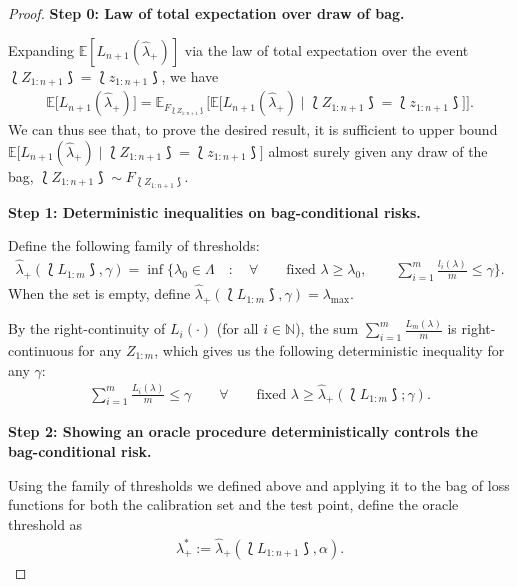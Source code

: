 \begin{proof} \qquad

\textbf{Step 0: Law of total expectation over draw of bag.}

Expanding $\mathbb{E}[L_{n+1}(\hat{\lambda}_{+})]$ via the law of total expectation over the event $\lbag Z_{1:n+1} \rbag = \lbag z_{1:n+1} \rbag$, we have
\begin{align}\label{eq:gcrc_exchangeable_step_0}
    \mathbb{E}\big[L_{n+1}(\hat{\lambda}_{+})\big] = \mathbb{E}_{F_{\lbag Z_{1:n+1}\rbag}}\Big[\mathbb{E}\Big[L_{n+1}(\hat{\lambda}_{+}) \mid \lbag Z_{1:n+1} \rbag = \lbag z_{1:n+1} \rbag\Big]\Big].
\end{align}
We can thus see that, to prove the desired result, it is sufficient to upper bound $\mathbb{E}\big[L_{n+1}(\hat{\lambda}_{+}) \mid \lbag Z_{1:n+1} \rbag = \lbag z_{1:n+1} \rbag\big]$ almost surely given any draw of the bag, $\lbag Z_{1:n+1}\rbag\sim F_{\lbag Z_{1:n+1}\rbag}$. 

\vspace{1cm}

\textbf{Step 1: Deterministic inequalities on bag-conditional risks.} 


Define the following family of thresholds:
\begin{align*}
    \hat{\lambda}_+(\lbag L_{1:m} \rbag, \gamma) = \inf \Big\{\lambda_0 \in \Lambda \quad : \quad \forall \qquad \text{fixed } \lambda \geq \lambda_0, \qquad \sum_{i=1}^{m}\frac{l_{i}(\lambda)}{m} \leq \gamma \Big\}.
\end{align*}
When the set is empty, define $\hat{\lambda}_+(\lbag L_{1:m} \rbag, \gamma)=\lambda_{\max}$.

By the right-continuity of $L_i(\cdot)$ (for all $i\in \mathbb{N}$), the sum $\sum_{i=1}^m\frac{L_m(\lambda)}{m}$ is right-continuous for any $Z_{1:m}$, which gives us the following deterministic inequality for any $\gamma$:
\begin{align}
    \label{eq:gcrc_exchangeable_step_1}
    \sum_{i=1}^m\frac{L_i(\lambda)}{m} \leq \gamma \qquad \forall \qquad \text{fixed } \lambda \geq \hat{\lambda}_{+}(\lbag L_{1:m}\rbag; \gamma).
\end{align}


\vspace{1cm}

\textbf{Step 2: Showing an oracle procedure deterministically controls the bag-conditional risk.}

Using the family of thresholds we defined above and applying it to the bag of loss functions for both the calibration set and the test point, define the oracle threshold as
\begin{align}\label{eq:oracle_lambda_def}
    \lambda_+^* := \hat{\lambda}_+(\lbag L_{1:n+1} \rbag, \alpha).
\end{align}


\end{proof}
